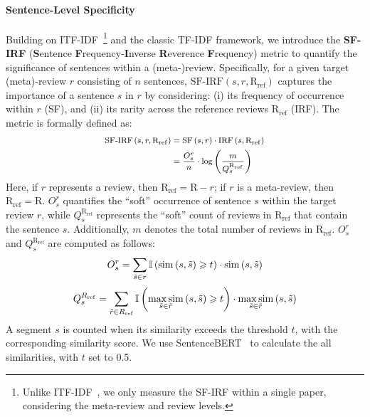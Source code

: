 \paragraph{Sentence-Level Specificity}
Building on ITF-IDF~\cite{du-etal-2024-llms}\footnote{Unlike ITF-IDF~\cite{du-etal-2024-llms}, we only measure the SF-IRF within a single paper, considering the meta-review and review levels.} and the classic TF-IDF framework, we introduce the \textbf{SF-IRF} (\textbf{S}entence \textbf{F}requency-\textbf{I}nverse \textbf{R}everence \textbf{F}requency) metric to quantify the significance of sentences within a (meta-)review. 
Specifically, for a given target (meta)-review $r$ consisting of $n$ sentences, $\mathrm{SF}\text{-}\mathrm{IRF}\left( s,r,\mathrm{R}_{\mathrm{ref}} \right)$ captures the importance of a sentence $s$ in $r$ by considering: (i) its frequency of occurrence within $r$ (SF), and (ii) its rarity across the reference reviews $\mathrm{R}_\mathrm{ref}$ (IRF). The metric is formally defined as:
\begin{equation}
\footnotesize{
    \begin{aligned}
        \mathrm{SF}\text{-}\mathrm{IRF}\left( s,r,\mathrm{R}_{\mathrm{ref}} \right) &= \mathrm{SF}\left( s,r \right) \cdot \mathrm{IRF}\left( s, \mathrm{R}_{\mathrm{ref}} \right) \\
        &= \frac{O_{s}^{r}}{n} \cdot \log \left( \frac{m}{Q_{s}^{\mathrm{R}_{\mathrm{ref}}}} \right)
    \end{aligned}}
\end{equation}
Here, if $r$ represents a review, then $\mathrm{R}_{\mathrm{ref}}=\mathrm{R}-r$; if $r$ is a meta-review, then $\mathrm{R}_{\mathrm{ref}}=\mathrm{R}$. $O_{s}^{r}$ quantifies the ``soft'' occurrence of sentence $s$ within the target review $r$, while $Q_{s}^{\mathrm{R}_{\mathrm{ref}}}$ represents the ``soft'' count of reviews in $\mathrm{R}_{\mathrm{ref}}$ that contain the sentence $s$. Additionally, $m$ denotes the total number of reviews in $\mathrm{R}_{\mathrm{ref}}$. $O_{s}^{r}$ and $Q_{s}^{\mathrm{R}_{\mathrm{ref}}}$ are computed as follows:
\begin{equation}
\footnotesize{
    O_{s}^{r} = \sum\limits_{\tilde{s} \in r} \mathbb{I} \left( \mathop {\mathrm{sim}} \left( s, \tilde{s} \right) \geqslant t \right) \cdot \mathop {\mathrm{sim}}  \left( s, \tilde{s} \right)}
\end{equation}
\begin{equation}
\footnotesize{
    Q_{s}^{R_{\mathrm{ref}}} = \sum\limits_{\tilde{r} \in  R_{\mathrm{ref}}} \mathbb{I} \left( \mathop {\max \mathrm{sim}} \limits_{\tilde{s} \in \tilde{r}} \left( s, \tilde{s} \right) \geqslant t \right) \cdot \mathop {\max \mathrm{sim}} \limits_{\tilde{s} \in \tilde{r}} \left( s, \tilde{s} \right)}
\end{equation}
A segment $s$ is counted when its similarity exceeds the threshold $t$, with the corresponding similarity score.
We use SentenceBERT~\cite{reimers-gurevych-2019-sentence} to calculate the all similarities, with $t$ set to 0.5.


